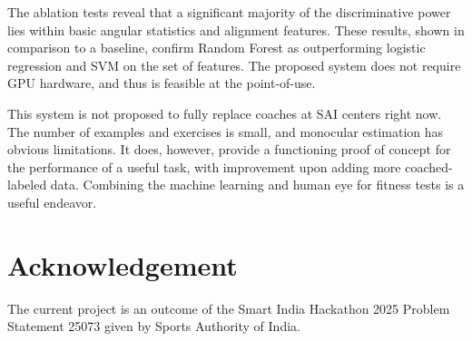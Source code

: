 \documentclass[conference]{IEEEtran}
\begin{document}
The ablation tests reveal that a significant majority of the discriminative power lies within basic angular statistics and alignment features. These results, shown in comparison to a baseline, confirm Random Forest as outperforming logistic regression and SVM on the set of features. The proposed system does not require GPU hardware, and thus is feasible at the point-of-use.

This system is not proposed to fully replace coaches at SAI centers right now. The number of examples and exercises is small, and monocular estimation has obvious limitations. It does, however, provide a functioning proof of concept for the performance of a useful task, with improvement upon adding more coached-labeled data. Combining the machine learning and human eye for fitness tests is a useful endeavor.

\section*{Acknowledgement}
The current project is an outcome of the Smart India Hackathon 2025 Problem Statement 25073 \cite{sih2025} given by Sports Authority of India.
\end{document}

